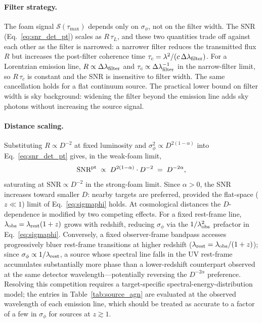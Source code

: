 \documentclass[aps,prd,onecolumn,amsmath,amssymb]{revtex4-2}
\begin{document}
\paragraph{Filter strategy.}
The foam signal $\mathcal{S}(\tau_{\max})$ depends only on $\sigma_\phi$, not on
the filter width.
The SNR (Eq.~\eqref{eq:snr_det_pt}) scales as $R\,\tau_L$, and these two
quantities trade off against each other as the filter is narrowed: a narrower
filter reduces the transmitted flux $R$ but increases the post-filter
coherence time $\tau_c = \lambda^2/(c\,\Delta\lambda_{\rm filter})$.
For a Lorentzian emission line, $R\propto\Delta\lambda_{\rm filter}$ and
$\tau_c\propto\Delta\lambda_{\rm filter}^{-1}$ in the narrow-filter limit,
so $R\,\tau_c$ is constant and the SNR is insensitive to filter width.
The same cancellation holds for a flat continuum source.
The practical lower bound on filter width is sky background: widening the
filter beyond the emission line adds sky photons without increasing the
source signal.

\paragraph{Distance scaling.}
Substituting $R\propto D^{-2}$ at fixed luminosity and
$\sigma_\phi^2\propto D^{2(1-\alpha)}$ into Eq.~\eqref{eq:snr_det_pt} gives, in
the weak-foam limit,
\begin{equation}
\textrm{SNR}^{\rm pt} \;\propto\; D^{2(1-\alpha)}\cdot D^{-2} \;=\; D^{-2\alpha},
\label{eq:dist_scaling_pt}
\end{equation}
saturating at $\textrm{SNR}\propto D^{-2}$ in the strong-foam limit.
Since $\alpha > 0$, the SNR increases toward smaller $D$: nearby targets are
preferred, provided the flat-space ($z\ll 1$) limit of
Eq.~\eqref{eq:sigmaphi} holds.
At cosmological distances the $D$-dependence is modified by two competing
effects.
For a fixed rest-frame line, $\lambda_{\rm obs}=\lambda_{\rm rest}(1+z)$ grows
with redshift, reducing $\sigma_\phi$ via the $1/\lambda_{\rm obs}^2$ prefactor
in Eq.~\eqref{eq:sigmaphi}.
Conversely, a fixed observer-frame bandpass accesses progressively bluer
rest-frame transitions at higher redshift
($\lambda_{\rm rest}=\lambda_{\rm obs}/(1+z)$); since
$\sigma_\phi\propto 1/\lambda_{\rm rest}$, a source whose spectral line falls
in the UV rest-frame accumulates substantially more phase than a lower-redshift
counterpart observed at the same detector wavelength---potentially reversing the
$D^{-2\alpha}$ preference.  Resolving this competition requires a
target-specific spectral-energy-distribution model; the entries in
Table~\ref{tab:source_agn} are evaluated at the observed wavelength of each
emission line, which should be treated as accurate to a factor of a few in
$\sigma_\phi$ for sources at $z\gtrsim 1$.
\end{document}
